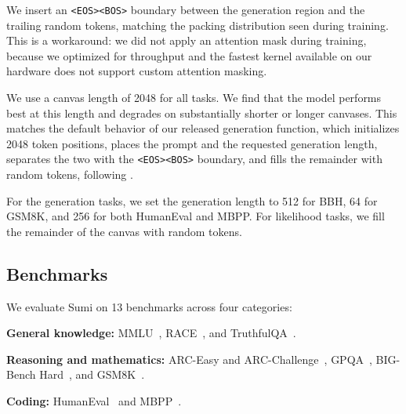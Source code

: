 \documentclass[11pt, a4paper]{style}
\begin{document}
We insert an \texttt{<EOS><BOS>} boundary between the generation region and the trailing random tokens, matching the packing distribution seen during training. This is a workaround: we did not apply an attention mask during training, because we optimized for throughput and the fastest kernel available on our hardware does not support custom attention masking.

We use a canvas length of 2048 for all tasks. We find that the model performs best at this length and degrades on substantially shorter or longer canvases. This matches the default behavior of our released generation function, which initializes 2048 token positions, places the prompt and the requested generation length, separates the two with the \texttt{<EOS><BOS>} boundary, and fills the remainder with random tokens, following \citep{rutte2026scaling}.

For the generation tasks, we set the generation length to 512 for BBH, 64 for GSM8K, and 256 for both HumanEval and MBPP. For likelihood tasks, we fill the remainder of the canvas with random tokens.


\begin{table}[t]
\centering
\caption{Benchmark result of Sumi-7B. Values are accuracy/score, with the number of in-context shots in parentheses. Bold marks the best score among models evaluated under our protocol. $^{*}$\,marks generation-based tasks; all other benchmarks are scored by a Monte Carlo estimate of the conditional likelihood (ELBO). $^{\dagger}$\,and $^{\ddagger}$\,denote scores taken from the LLaDA paper~\citep{nie2026llada} and the Dream paper~\citep{ye2025dream}, respectively.}
\label{tab:main-results}
\setlength{\tabcolsep}{5pt}
\resizebox{\textwidth}{!}{%
%
}
\end{table}

\subsection{Benchmarks}
We evaluate Sumi on 13 benchmarks across four categories:

\textbf{General knowledge:} MMLU~\citep{hendrycks2021mmlu}, RACE~\citep{lai2017race}, and TruthfulQA~\citep{lin2022truthfulqa}.

\textbf{Reasoning and mathematics:} ARC-Easy and ARC-Challenge~\citep{clark2018arc}, GPQA~\citep{rein2024gpqa}, BIG-Bench Hard~\citep{suzgun2023bbh}, and GSM8K~\citep{cobbe2021gsm8k}. 

\textbf{Coding:} HumanEval~\citep{chen2021humaneval} and MBPP~\citep{austin2021mbpp}.
\end{document}
